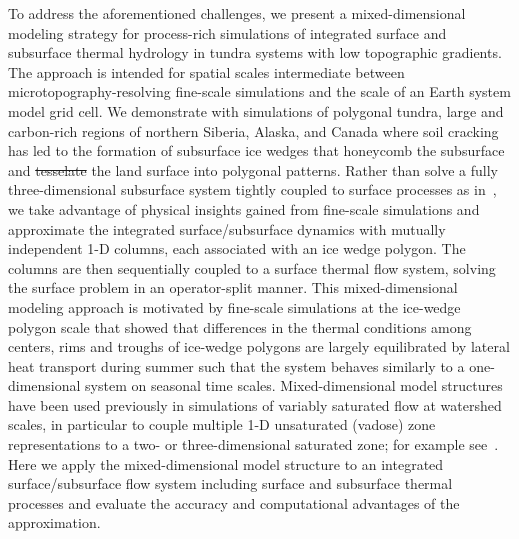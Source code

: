 \documentclass[review,11pt]{elsarticle}
\providecommand{\DIFadd}[1]{{\protect\color{blue}\uwave{#1}}} %
\providecommand{\DIFdel}[1]{{\protect\color{red}\sout{#1}}}                      %
\providecommand{\DIFaddbegin}{} %
\providecommand{\DIFaddend}{} %
\providecommand{\DIFdelbegin}{} %
\providecommand{\DIFdelend}{} %
\begin{document}
To address the aforementioned challenges, we present a mixed-dimensional modeling strategy for process-rich simulations of integrated surface and subsurface thermal hydrology in tundra systems with low topographic gradients. The approach is intended for spatial scales intermediate between microtopography-resolving fine-scale simulations and the scale of an Earth system model grid cell. We demonstrate with simulations of polygonal tundra, large and carbon-rich regions of northern Siberia, Alaska, and Canada where soil cracking has led to the formation of subsurface ice wedges that honeycomb the subsurface and \DIFdelbegin \DIFdel{tesselate }\DIFdelend \DIFaddbegin \DIFadd{tessellate }\DIFaddend the land surface into polygonal patterns. Rather than solve a fully three-dimensional subsurface system tightly coupled to surface processes as in~\cite{spainter2016integrated}, we take advantage of physical insights gained from fine-scale simulations and approximate the integrated surface/subsurface dynamics with mutually independent 1-D columns, each associated with an ice wedge polygon. The columns are then sequentially coupled to a surface thermal flow system, solving the surface problem in an operator-split manner. This mixed-dimensional modeling approach is motivated by fine-scale simulations at the ice-wedge polygon scale that showed that differences in the thermal conditions among centers, rims and troughs of ice-wedge polygons are largely equilibrated by lateral heat transport during summer such that the system behaves similarly to a one-dimensional system on seasonal time scales. Mixed-dimensional model structures have been used previously in simulations of variably saturated flow at watershed scales, in particular to couple multiple 1-D unsaturated (vadose) zone representations to a two- or three-dimensional saturated zone; for example see~\cite{pikul1974numerical,zhu2011method,hybrid3D}. Here we apply the mixed-dimensional model structure to an integrated surface/subsurface flow system including surface and subsurface thermal processes and evaluate the accuracy and computational advantages of the approximation. 

\end{document}
